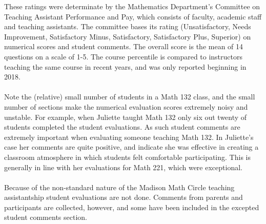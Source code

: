 \documentclass[letterpaper,11pt]{article}
\begin{document}
These ratings were determinate by the Mathematics Department's Committee on Teaching Assistant Performance and Pay, which consists of faculty, academic staff and teaching assistants. The committee bases its rating (Unsatisfactory, Needs Improvement, Satisfactory Minus, Satisfactory, Satisfactory Plus, Superior) on numerical scores and student comments. The overall score is the mean of 14 questions on a scale of 1-5. The course percentile is compared to instructors teaching the same course in recent years, and was only reported beginning in 2018.
\\
\
\\
Note the (relative) small number of students in a Math 132 class, and the small number of sections make the numerical evaluation scores extremely noisy and unstable. For example, when Juliette taught Math 132 only six out twenty of students completed the student evaluations. As such student comments are extremely important when evaluating someone teaching Math 132. In Juliette's case her comments are quite positive, and indicate she was effective in creating a classroom atmosphere in which students felt comfortable participating. This is generally in line with her evaluations for Math 221, which were exceptional.
\\
\
\\
Because of the non-standard nature of the Madison Math Circle teaching assistantship student evaluations are not done. Comments from parents and participants are collected, however, and some have been included in the excepted student comments section. 
\end{document}
